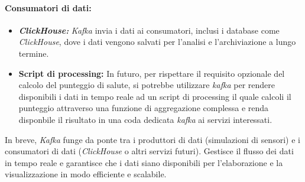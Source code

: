\paragraph*{Consumatori di dati:}
\begin{itemize}
  \item \textbf{\textit{ClickHouse:}} \textit{Kafka} invia i dati ai consumatori, inclusi i database come \textit{ClickHouse}, dove i dati vengono salvati per l'analisi e l'archiviazione a lungo termine.
  \item \textbf{Script di processing:} In futuro, per rispettare il requisito opzionale del calcolo del punteggio di salute, si potrebbe utilizzare \textit{kafka} per rendere disponibili i dati in tempo reale ad un script di processing il quale calcoli il punteggio attraverso una funzione di aggregazione complessa e renda  disponbile il risultato in una coda dedicata \textit{kafka} ai servizi interessati.
\end{itemize}

In breve, \textit{Kafka} funge da ponte tra i produttori di dati (simulazioni di sensori) e i consumatori di dati (\textit{ClickHouse} o altri servizi futuri). Gestisce il flusso dei dati in tempo reale e garantisce che i dati siano disponibili per l'elaborazione e la visualizzazione in modo efficiente e scalabile.